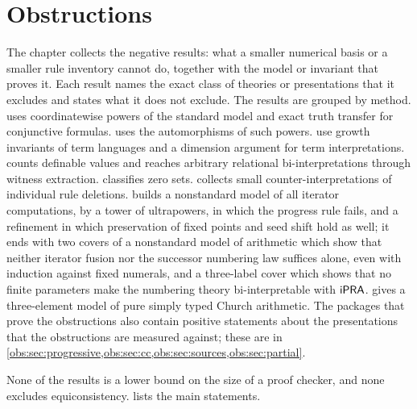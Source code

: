 \chapter{Obstructions}
\label{prov:ch:obs}
\label{obs:ch}

The chapter collects the negative results: what a smaller numerical basis or a
smaller rule inventory cannot do, together with the model or invariant that
proves it. Each result names the exact class of theories or presentations that
it excludes and states what it does not exclude. The results are grouped by
method.  uses coordinatewise powers of the standard model
and exact truth transfer for conjunctive formulas.  uses
the automorphisms of such powers.  use
growth invariants of term languages and a dimension argument for term
interpretations.  counts definable values and reaches
arbitrary relational bi-interpretations through witness extraction.
 classifies zero sets.  collects
small counter-interpretations of individual rule deletions.
 builds a nonstandard model of all iterator
computations, by a tower of ultrapowers, in which the progress rule fails, and a
refinement in which preservation of fixed points and seed shift hold as well;
it ends with two covers of a nonstandard model of arithmetic which show that
neither iterator fusion nor the successor numbering law suffices alone, even
with induction against fixed numerals, and a three-label cover which shows that
no finite parameters make the numbering theory bi-interpretable with $\mathsf{iPRA}$.
 gives a three-element model of pure simply typed Church
arithmetic. The packages that
prove the obstructions also contain positive statements about the presentations
that the obstructions are measured against; these are
in \cref{obs:sec:progressive,obs:sec:cc,obs:sec:sources,obs:sec:partial}.

None of the results is a lower bound on the size of a proof checker, and none
excludes equiconsistency.  lists the main statements.

